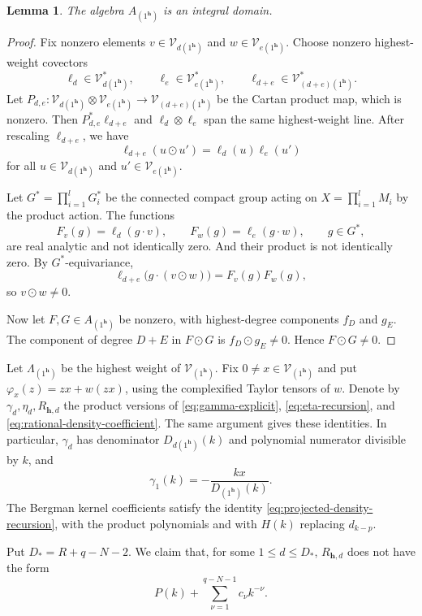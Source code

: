 \documentclass[11pt,reqno]{amsart}
\newtheorem{lemma}[theorem]{Lemma}
\theoremstyle{corollary}
\theoremstyle{conjecture}
\theoremstyle{assumption}
\theoremstyle{proposition}
\theoremstyle{remark}
\numberwithin{equation}{section}
\begin{document}
\begin{lemma}\label{lem:prod-cartan-domain}
The algebra $A_{(1^{\mathbf h})}$ is an integral domain.
\end{lemma}

\begin{proof}
Fix nonzero elements $v\in\mathcal V_{d(1^{\mathbf h})}$ and $w\in\mathcal V_{e(1^{\mathbf h})}$. Choose nonzero highest-weight
covectors
\[
\ell_d\in\mathcal V_{d(1^{\mathbf h})}^*,\qquad \ell_e\in\mathcal V_{e(1^{\mathbf h})}^*,\qquad \ell_{d+e}\in\mathcal V_{(d+e)(1^{\mathbf h})}^*.
\]
Let $P_{d,e}\colon\mathcal V_{d(1^{\mathbf h})}\otimes\mathcal V_{e(1^{\mathbf h})}\longrightarrow\mathcal V_{(d+e)(1^{\mathbf h})}$ be the Cartan product map, which is nonzero. Then $P_{d,e}^*\ell_{d+e}$ and $\ell_d\otimes\ell_e$ span the same highest-weight line. After rescaling $\ell_{d+e}$, we have
\[
\ell_{d+e}(u\odot u')=\ell_d(u)\ell_e(u')
\]
for all $u\in\mathcal V_{d(1^{\mathbf h})}$ and $u'\in\mathcal V_{e(1^{\mathbf h})}$.

Let $G^*=\prod_{i=1}^{l}G_i^*$ be the connected compact group acting on $X=\prod_{i=1}^{l}M_i$ by the product action. The functions
\[
F_v(g)=\ell_d(g\cdot v),\qquad F_w(g)=\ell_e(g\cdot w),\qquad g\in G^*,
\]
are real analytic and not identically zero. And their product is not identically zero. By $G^*$-equivariance,
\[
\ell_{d+e}\bigl(g\cdot(v\odot w)\bigr)=F_v(g)F_w(g),
\]
so $v\odot w\neq 0$.

Now let $F,G\in A_{(1^{\mathbf h})}$ be nonzero, with highest-degree components $f_D$ and $g_E$. The component of degree $D+E$ in $F\odot G$ is $f_D\odot g_E\neq 0$. Hence $F\odot G\neq 0$.
\end{proof}

Let $\Lambda_{(1^{\mathbf h})}$ be the highest weight of $\mathcal V_{(1^{\mathbf h})}$. Fix $0\neq x\in\mathcal V_{(1^{\mathbf h})}$ and put $\varphi_x(z)=zx+w(zx)$, using the complexified Taylor tensors of $w$. Denote by $\gamma_d,\eta_d,R_{\mathbf h,d}$ the product versions of \eqref{eq:gamma-explicit}, \eqref{eq:eta-recursion}, and \eqref{eq:rational-density-coefficient}. The same argument gives these identities. In particular, $\gamma_d$ has denominator $D_{d(1^{\mathbf h})}(k)$ and polynomial numerator divisible by $k$, and
\[
 \gamma_1(k)=-\frac{kx}{D_{(1^{\mathbf h})}(k)}.
\]
The Bergman kernel coefficients satisfy the identity \eqref{eq:projected-density-recursion}, with the product polynomials and with $H(k)$ replacing $d_{k-p}$.

Put $D_*=R+q-N-2$. We claim that, for some $1\leq d\leq D_*$, $R_{\mathbf h,d}$ does not have the form
\begin{equation}\label{eq:prod-allowed-laurent}
P(k)+\sum_{\nu=1}^{q-N-1}c_\nu k^{-\nu}.
\end{equation}
\end{document}

